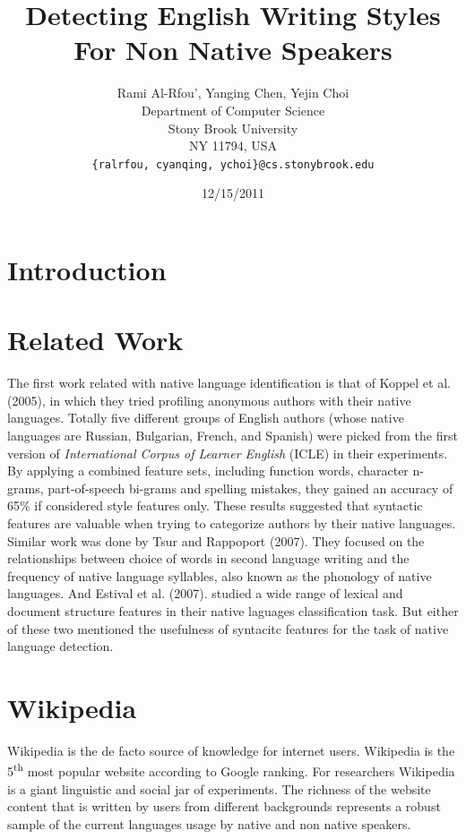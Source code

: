 \documentclass[11pt]{article}
\title{Detecting English Writing Styles For Non Native Speakers}
\author{Rami Al-Rfou', Yanging Chen, Yejin Choi \\
  Department of Computer Science \\
  Stony Brook University \\
  NY 11794, USA \\
  {\tt \{ralrfou, cyanqing, ychoi\}@cs.stonybrook.edu}}
\date{12/15/2011}
\begin{document}
\maketitle
\begin{abstract}
\end{abstract}


\section{Introduction}

\section{Related Work}
  The first work related with native language identification is that of Koppel et al. (2005), in which they tried profiling anonymous authors with their native languages. Totally five different groups of English authors (whose native languages are Russian, Bulgarian, French, and Spanish) were picked from the first version of {\em International Corpus of Learner English} (ICLE) in their experiments. By applying a combined feature sets, including function words, character n-grams, part-of-speech bi-grams and spelling mistakes, they gained an accuracy of 65\% if considered style features only. These results suggested that syntactic features are valuable when trying to categorize authors by their native languages.  
  Similar work was done by Tsur and Rappoport (2007). They focused on the relationships between choice of words in second language writing and the frequency of native language syllables, also known as the phonology of native languages. And Estival et al. (2007). studied a wide range of lexical and document structure features in their native laguages classification task. But either of these two mentioned the usefulness of syntacitc features for the task of native language detection.
   

\section{Wikipedia}

Wikipedia is the de facto source of knowledge for internet users. Wikipedia is the 5\textsuperscript{th} most popular website according to Google ranking. For researchers Wikipedia is a giant linguistic and social jar of experiments. The richness of the website content that is written by users from different backgrounds represents a robust sample of the current languages usage by native and non native speakers.
\end{document}
